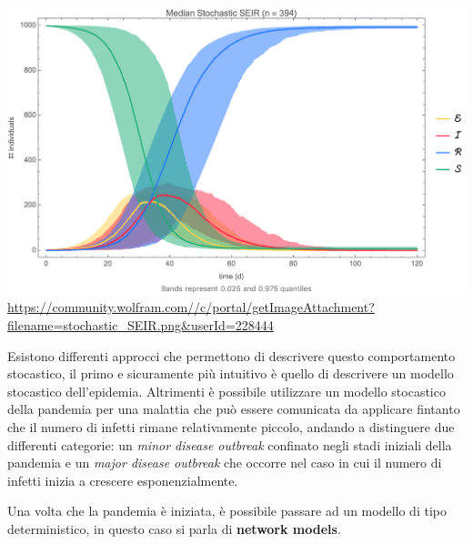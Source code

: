 \begin{minipage}{\linewidth}
    \centering
    \includegraphics[width=\textwidth]{img/stochastic_SEIR.png}
    \url{https://community.wolfram.com//c/portal/getImageAttachment?filename=stochastic_SEIR.png&userId=228444}
    \label{fig:stochastic_SEIR_model}
\end{minipage}

Esistono differenti approcci che permettono di descrivere questo comportamento stocastico, il primo e 
sicuramente più intuitivo è quello di descrivere un modello stocastico dell'epidemia. Altrimenti è possibile 
utilizzare un modello stocastico della pandemia per una malattia che può essere comunicata da applicare 
fintanto che il numero di infetti rimane relativamente piccolo, andando a distinguere due differenti categorie:
un \emph{minor disease outbreak} confinato negli stadi iniziali della pandemia e un 
\emph{major disease outbreak} che occorre nel caso in cui il numero di infetti inizia a crescere esponenzialmente.

Una volta che la pandemia è iniziata, è possibile passare ad un modello di tipo deterministico, in questo caso si 
parla di \textbf{network models}.
